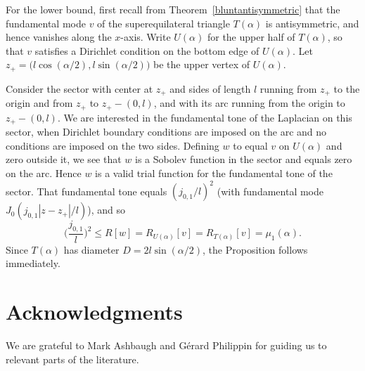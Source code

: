 \documentclass[11pt,reqno]{amsart}
\numberwithin{equation}{section}
\begin{document}
For the lower bound, first recall from Theorem~\ref{bluntantisymmetric} that
the fundamental mode $v$ of the superequilateral triangle $T(\alpha)$ is antisymmetric, and hence vanishes along the $x$-axis. Write $U(\alpha)$ for the upper half of $T(\alpha)$, so that $v$ satisfies a Dirichlet condition on the bottom edge of $U(\alpha)$. Let $z_+= \big( l\cos(\alpha/2),l\sin(\alpha/2) \big)$ be the upper vertex of $U(\alpha)$.

Consider the sector with center at $z_+$ and sides of length $l$ running from $z_+$ to the origin and from $z_+$ to $z_+ - (0,l)$, and with its arc running from the origin to $z_+ - (0,l)$. We are interested in the fundamental tone of the Laplacian on this sector, when Dirichlet boundary conditions are imposed on the arc and no conditions are imposed on the two sides. Defining $w$ to equal $v$ on $U(\alpha)$ and zero outside it, we see that $w$ is a Sobolev function in the sector and equals zero on the arc. Hence $w$ is a valid trial function for the fundamental tone of the sector. That fundamental tone equals $(j_{0,1}/l)^2$ (with fundamental mode $J_0(j_{0,1}|z-z_+|/l)$), and so
\[
\Big( \frac{j_{0,1}}{l} \Big)^{\! 2} \leq R[w] = R_{U(\alpha)}[v] = R_{T(\alpha)}[v] = \mu_1(\alpha) .
\]
Since $T(\alpha)$ has diameter $D=2l\sin(\alpha/2)$, the Proposition follows immediately.

\section*{Acknowledgments} We are grateful to Mark Ashbaugh and G\'{e}rard Philippin for guiding us to relevant parts of the literature.  
\end{document}
